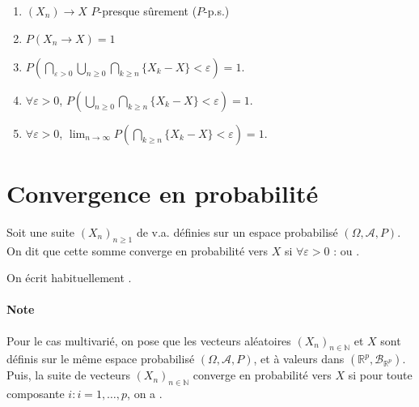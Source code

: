 \documentclass[10pt, french]{report}
\begin{document}
\begin{multicols*}{2}
\begin{definitionNOHFILLprop}
\begin{enumerate}[label = \circled{\arabic*}{trueblue}]
	\item	$(X_{n}) \rightarrow X$ $P$-presque sûrement ($P$-p.s.)
	\item	$P(X_{n} \rightarrow X) = 1$
	\item	$\displaystyle P\left(\bigcap_{\varepsilon > 0}\bigcup_{n \geq 0}\bigcap_{k \geq n} \{X_{k} - X\} < \varepsilon\right) = 1$.
	\item	$\forall \varepsilon > 0$, $\displaystyle P\left(\bigcup_{n \geq 0}\bigcap_{k \geq n} \{X_{k} - X\} < \varepsilon\right) = 1$.
	\item	$\forall \varepsilon > 0$, $\displaystyle \lim_{n \rightarrow \infty}P\left(\bigcap_{k \geq n} \{X_{k} - X\} < \varepsilon\right) = 1$.
\end{enumerate}
\end{definitionNOHFILLprop}



\columnbreak
\section{Convergence en probabilité}
\begin{definitionNOHFILL}
Soit une suite $(X_{n})_{n \geq 1}$ de v.a. définies sur un espace probabilisé $(\Omega, \mathcal{A}, P)$. On dit que cette somme converge en probabilité vers $X$ si $\forall \varepsilon > 0$ :  ou . 

\bigskip

On écrit habituellement .

\paragraph{Note}	Pour le cas multivarié, on pose que les vecteurs aléatoires $(X_{n})_{n \in \mathbb{N}}$ et $X$ sont définis sur le même espace probabilisé $(\Omega, \mathcal{A}, P)$, et à valeurs dans $(\mathbb{R}^{p}, \mathcal{B}_{\mathbb{R}^{p}})$. Puis, la suite de vecteurs $(X_{n})_{n \in \mathbb{N}}$ converge en probabilité vers $X$ si pour toute composante $i : i = 1, \dots, p$, on a .
\end{definitionNOHFILL}


\end{multicols*}
\end{document}
